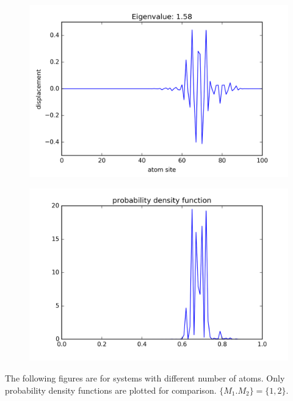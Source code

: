 \begin{figure}[!htbh]
\centering
\begin{minipage}{.45\textwidth}
  \centering
  \includegraphics[width=1.1\linewidth]{Harmonic_mass_ratio/normal_Prob_0_5N_103m_2p_76th.png}
  \label{fig:mass high frequency}
\end{minipage}\qquad
\begin{minipage}{.45\textwidth}
  \centering
  \includegraphics[width=1.1\linewidth]{Harmonic_mass_ratio/densProb_0_5N_103m_2p_76th.png}
  \label{fig:N103_1_2_76th_density}
\end{minipage}
\end{figure}


The following figures are for systems with different number of atoms. Only probability density functions are plotted for comparison. $\{M_1.M_2\} = \{1,2\}$.  

